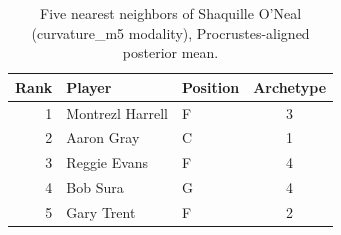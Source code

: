 \begin{table}[htbp]
  \centering\small
  \begin{tabular}{rllc}
    \toprule
    Rank & Player & Position & Archetype \\
    \midrule
    1 & Montrezl Harrell & F & 3 \\
    2 & Aaron Gray & C & 1 \\
    3 & Reggie Evans & F & 4 \\
    4 & Bob Sura & G & 4 \\
    5 & Gary Trent & F & 2 \\
    \bottomrule
  \end{tabular}
  \caption{Five nearest neighbors of Shaquille O'Neal (curvature_m5 modality), Procrustes-aligned posterior mean.}
  \label{tab:Shaquille_O_Neal_neighbors_curvature_m5}
\end{table}

